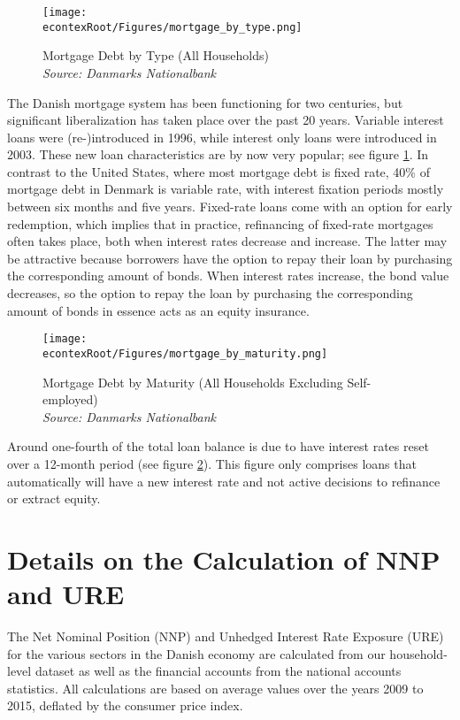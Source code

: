 \documentclass[titlepage]{\econtex}\newcommand{\texname}{ConsumptionHeterogeneity}
\begin{document}
	\begin{figure} 
		\begin{centering}
			\texttt{[image: \\econtexRoot/Figures/mortgage\_by\_type.png]} 
			\caption{Mortgage Debt by Type (All Households)
				{\\ \emph{\footnotesize
						{Source: Danmarks Nationalbank}}
			}}
			\label{fig:mortgage_by_type}
		\end{centering}
	\end{figure}
	
	The Danish mortgage system has been functioning for two centuries, but significant liberalization has taken place over the past 20 years. Variable interest loans were (re-)introduced in 1996, while interest only loans were introduced in 2003. These new loan characteristics are by now very popular; see figure \ref{fig:mortgage_by_type}. In contrast to the United States, where most mortgage debt is fixed rate, 40\% of mortgage debt in Denmark is variable rate, with interest fixation periods mostly between six months and five years. Fixed-rate loans come with an option for early redemption, which implies that in practice, refinancing of fixed-rate mortgages often takes place, both when interest rates decrease and increase. The latter may be attractive because borrowers have the option to repay their loan by purchasing the corresponding amount of bonds. When interest rates increase, the bond value decreases, so the option to repay the loan by purchasing the corresponding amount of bonds in essence acts as an equity insurance.  
	
	\begin{figure} 
		\begin{centering}
			\texttt{[image: \\econtexRoot/Figures/mortgage\_by\_maturity.png]} 
			\caption{Mortgage Debt by Maturity (All Households Excluding Self-employed)
				{\\ \emph{\footnotesize
						{Source: Danmarks Nationalbank}}
			}}
			\label{fig:mortgage_by_maturity}
		\end{centering}
	\end{figure}
	
	Around one-fourth of the total loan balance is due to have interest rates reset over a 12-month period (see figure \ref{fig:mortgage_by_maturity}). This figure only comprises loans that automatically will have a new interest rate and not active decisions to refinance or extract equity. 
	
	\section{Details on the Calculation of NNP and URE}
	\setcounter{figure}{0}   
	\setcounter{table}{0} 
	\label{URE_NNP_appendix}
	The Net Nominal Position (NNP) and Unhedged Interest Rate Exposure (URE) for the various sectors in the Danish economy are calculated from our household-level dataset as well as the financial accounts from the national accounts statistics. All calculations are based on average values over the years 2009 to 2015, deflated by the consumer price index. 
	
\end{document}
